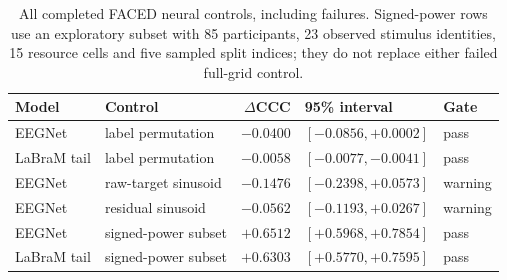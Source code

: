 \begin{table}[htbp]\centering\small
\caption{All completed FACED neural controls, including failures. Signed-power rows use an exploratory subset with 85 participants, 23 observed stimulus identities, 15 resource cells and five sampled split indices; they do not replace either failed full-grid control.}
\label{tab:v14-controls}
\begin{tabularx}{\linewidth}{@{}l l r X l@{}}\toprule
Model & Control & $\Delta$CCC & 95\% interval & Gate\\\midrule
EEGNet & label permutation & $-0.0400$ & $[-0.0856, +0.0002]$ & pass \\
LaBraM tail & label permutation & $-0.0058$ & $[-0.0077, -0.0041]$ & pass \\
EEGNet & raw-target sinusoid & $-0.1476$ & $[-0.2398, +0.0573]$ & warning \\
EEGNet & residual sinusoid & $-0.0562$ & $[-0.1193, +0.0267]$ & warning \\
EEGNet & signed-power subset & $+0.6512$ & $[+0.5968, +0.7854]$ & pass \\
LaBraM tail & signed-power subset & $+0.6303$ & $[+0.5770, +0.7595]$ & pass \\
\bottomrule\end{tabularx}
\end{table}
